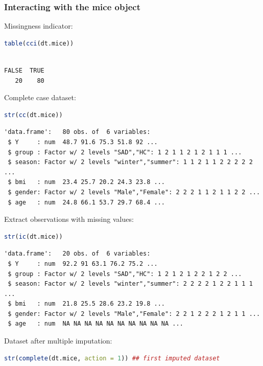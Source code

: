 \documentclass[12pt]{article}
\begin{document}
\subsubsection{Interacting with the mice object}
\label{sec:org9203133}

Missingness indicator:
\begin{lstlisting}[language=r,numbers=none]
table(cci(dt.mice))
\end{lstlisting}

\label{}
\begin{verbatim}

FALSE  TRUE 
   20    80
\end{verbatim}


\clearpage

Complete case dataset:
\begin{lstlisting}[language=r,numbers=none]
str(cc(dt.mice))
\end{lstlisting}

\label{}
\begin{verbatim}
'data.frame':	80 obs. of  6 variables:
 $ Y     : num  48.7 91.6 75.3 51.8 92 ...
 $ group : Factor w/ 2 levels "SAD","HC": 1 2 1 1 2 1 2 1 1 1 ...
 $ season: Factor w/ 2 levels "winter","summer": 1 1 2 1 1 2 2 2 2 2 ...
 $ bmi   : num  23.4 25.7 20.2 24.3 23.8 ...
 $ gender: Factor w/ 2 levels "Male","Female": 2 2 2 1 1 2 1 1 2 2 ...
 $ age   : num  24.8 66.1 53.7 29.7 68.4 ...
\end{verbatim}


Extract observations with missing values:
\begin{lstlisting}[language=r,numbers=none]
str(ic(dt.mice))
\end{lstlisting}

\label{}
\begin{verbatim}
'data.frame':	20 obs. of  6 variables:
 $ Y     : num  92.2 91 63.1 76.2 75.2 ...
 $ group : Factor w/ 2 levels "SAD","HC": 1 2 1 2 1 2 2 1 2 2 ...
 $ season: Factor w/ 2 levels "winter","summer": 2 2 2 2 1 2 2 1 1 1 ...
 $ bmi   : num  21.8 25.5 28.6 23.2 19.8 ...
 $ gender: Factor w/ 2 levels "Male","Female": 2 2 1 2 2 2 1 2 1 1 ...
 $ age   : num  NA NA NA NA NA NA NA NA NA NA ...
\end{verbatim}


Dataset after multiple imputation:
\begin{lstlisting}[language=r,numbers=none]
str(complete(dt.mice, action = 1)) ## first imputed dataset
\end{lstlisting}
\end{document}
